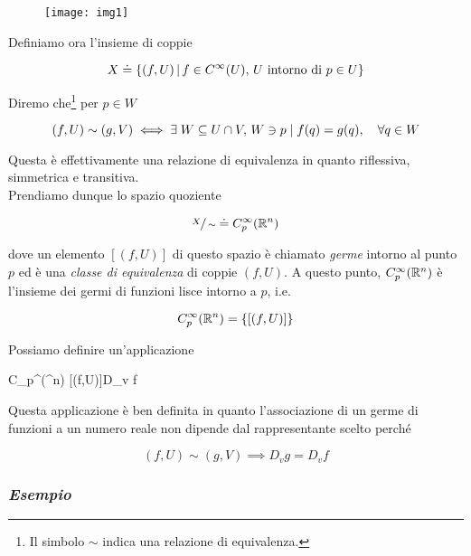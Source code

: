 \begin{figure}[H]
	\centering
	\texttt{[image: img1]}
\end{figure}

Definiamo ora l'insieme di coppie

\begin{equation}
	X \doteq \left\{ (f,U) \, \middle| \, f \in C^{\infty}(U), \, U \text{ intorno di } p \in U \right\}
\end{equation}

Diremo che\footnote{%
	Il simbolo $ \sim $ indica una relazione di equivalenza.%
} per $ p \in W $

\begin{equation}
	(f,U) \sim (g,V) \iff \E W \subseteq U \cap V, \, W \ni p \mid f(q) = g(q) \qcomma \forall q \in W
\end{equation}

Questa è effettivamente una relazione di equivalenza in quanto riflessiva, simmetrica e transitiva.\\
Prendiamo dunque lo spazio quoziente

\begin{equation}
	\sfrac{X}{\sim} \doteq C_{p}^{\infty}(\mathbb{R}^{n})
\end{equation}

dove un elemento $ [(f,U)] $ di questo spazio è chiamato \textit{germe} intorno al punto $ p $ ed è una \textit{classe di equivalenza} di coppie $ (f,U) $. A questo punto, $ C_{p}^{\infty}(\mathbb{R}^{n}) $ è l'insieme dei germi di funzioni lisce intorno a $ p $, i.e.

\begin{equation}
	C_{p}^{\infty}(\mathbb{R}^{n}) = \left\{ [(f,U)] \right\}
\end{equation} 

Possiamo definire un'applicazione

%
	{C_{p}^{\infty}(\R^{n})}{\R}%
	{[(f,U)]}{D_{v} f}

Questa applicazione è ben definita in quanto l'associazione di un germe di funzioni a un numero reale non dipende dal rappresentante scelto perché

\begin{equation}
	(f,U) \sim (g,V) \implies D_{v} g = D_{v} f
\end{equation}

\subsubsection{\textit{Esempio}}

